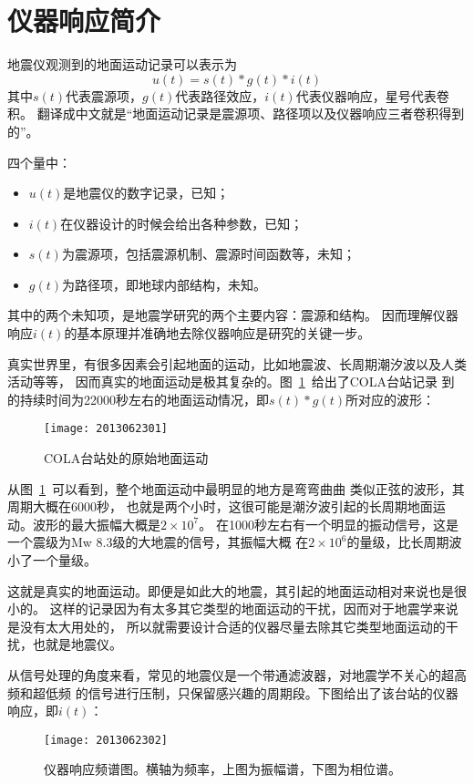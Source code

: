 \section{仪器响应简介}
地震仪观测到的地面运动记录可以表示为
\[  u(t) = s(t) * g(t) * i(t) \]
其中$s(t)$代表震源项，$g(t)$代表路径效应，$i(t)$代表仪器响应，星号代表卷积。
翻译成中文就是“地面运动记录是震源项、路径项以及仪器响应三者卷积得到的”。

四个量中：
\begin{itemize}
\item $u(t)$是地震仪的数字记录，已知；
\item $i(t)$在仪器设计的时候会给出各种参数，已知；
\item $s(t)$为震源项，包括震源机制、震源时间函数等，未知；
\item $g(t)$为路径项，即地球内部结构，未知。
\end{itemize}
其中的两个未知项，是地震学研究的两个主要内容：震源和结构。
因而理解仪器响应$i(t)$的基本原理并准确地去除仪器响应是研究的关键一步。

真实世界里，有很多因素会引起地面的运动，比如地震波、长周期潮汐波以及人类活动等等，
因而真实的地面运动是极其复杂的。图~\ref{fig:ground-motion}~给出了COLA台站记录
到的持续时间为22000秒左右的地面运动情况，即$s(t)*g(t)$所对应的波形：

\begin{figure}[H]
\centering
\texttt{[image: 2013062301]}
\caption{COLA台站处的原始地面运动}
\label{fig:ground-motion}
\end{figure}

从图~\ref{fig:ground-motion}~可以看到，整个地面运动中最明显的地方是弯弯曲曲
类似正弦的波形，其周期大概在6000秒，
也就是两个小时，这很可能是潮汐波引起的长周期地面运动。波形的最大振幅大概是$2\times10^7$。
在1000秒左右有一个明显的振动信号，这是一个震级为Mw 8.3级的大地震的信号，其振幅大概
在$2\times10^6$的量级，比长周期波小了一个量级。

这就是真实的地面运动。即便是如此大的地震，其引起的地面运动相对来说也是很小的。
这样的记录因为有太多其它类型的地面运动的干扰，因而对于地震学来说是没有太大用处的，
所以就需要设计合适的仪器尽量去除其它类型地面运动的干扰，也就是地震仪。

从信号处理的角度来看，常见的地震仪是一个带通滤波器，对地震学不关心的超高频和超低频
的信号进行压制，只保留感兴趣的周期段。下图给出了该台站的仪器响应，即$i(t)$：

\begin{figure}[H]
\centering
\texttt{[image: 2013062302]}
\caption{仪器响应频谱图。横轴为频率，上图为振幅谱，下图为相位谱。}
\label{fig:transfer-function}
\end{figure}

